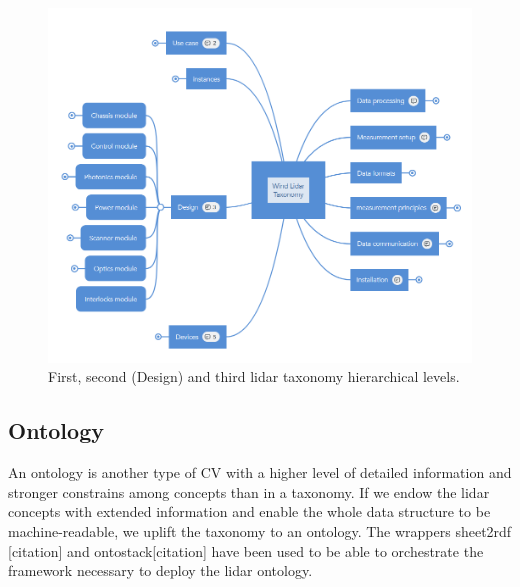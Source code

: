 \documentclass[remotesensing,article,submit,pdftex,moreauthors]{Definitions/mdpi}
\begin{document}
\begin{figure}[h]
    \centering
    \includegraphics[width=12cm]{MindMap.PNG}
    
    \caption{First, second (Design) and third lidar taxonomy hierarchical levels.}
    \label{tax}
\end{figure}


\subsection{Ontology }
An ontology is another type of CV with a higher level of detailed information and stronger constrains among concepts than in a taxonomy. If we endow the lidar concepts with extended information and enable the whole data structure to be machine-readable, we uplift the taxonomy to an ontology. The wrappers sheet2rdf [citation] and ontostack[citation] have been used to be able  to orchestrate the framework necessary to deploy the lidar ontology.
\end{document}

